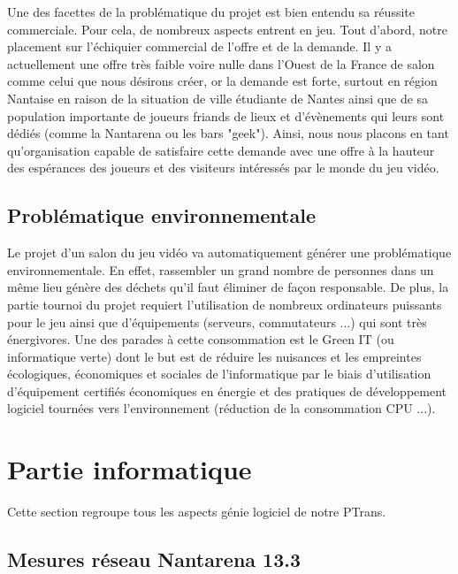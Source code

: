 \documentclass[french]{article}
\begin{document}
Une des facettes de la problématique du projet est bien entendu sa réussite commerciale. Pour cela, de nombreux aspects entrent en jeu. Tout d'abord, notre placement sur l'échiquier commercial de l'offre et de la demande. Il y a actuellement une offre très faible voire nulle dans l'Ouest de la France de salon comme celui que nous désirons créer, or la demande est forte, surtout en région Nantaise en raison de la situation de ville étudiante de Nantes ainsi que de sa population importante de joueurs friands de lieux et d'évènements qui leurs sont dédiés (comme la Nantarena ou les bars "geek"). Ainsi, nous nous placons en tant qu'organisation capable de satisfaire cette demande avec une offre à la hauteur des espérances des joueurs et des visiteurs intéressés par le monde du jeu vidéo.

\subsection{Problématique environnementale}

Le projet d'un salon du jeu vidéo va automatiquement générer une problématique environnementale. En effet, rassembler un grand nombre de personnes dans un même lieu génère des déchets qu'il faut éliminer de façon responsable. De plus, la partie tournoi du projet requiert l'utilisation de nombreux ordinateurs puissants pour le jeu ainsi que d'équipements (serveurs, commutateurs ...) qui sont très énergivores. Une des parades à cette consommation est le Green IT (ou informatique verte) dont le but est de réduire les nuisances et les empreintes écologiques, économiques et sociales de l'informatique par le biais d'utilisation d'équipement certifiés économiques en énergie et des pratiques de développement logiciel tournées vers l'environnement (réduction de la consommation CPU ...).


\newpage

\section{Partie informatique}

Cette section regroupe tous les aspects génie logiciel de notre PTrans.

\subsection{Mesures réseau Nantarena 13.3}
\end{document}
